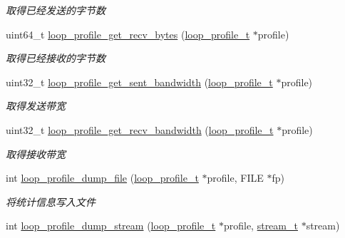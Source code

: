 \begin{DoxyCompactItemize}
\begin{DoxyCompactList}\small\item\em 取得已经发送的字节数 \end{DoxyCompactList}\item 
uint64\+\_\+t \hyperlink{a00080_aabcce950d0234d7dab3740e97f914c95_aabcce950d0234d7dab3740e97f914c95}{loop\+\_\+profile\+\_\+get\+\_\+recv\+\_\+bytes} (\hyperlink{a00051_ad060e1396346d2f5db1ec0597376a107_ad060e1396346d2f5db1ec0597376a107}{loop\+\_\+profile\+\_\+t} $\ast$profile)
\begin{DoxyCompactList}\small\item\em 取得已经接收的字节数 \end{DoxyCompactList}\item 
uint32\+\_\+t \hyperlink{a00080_a05b508d71cdd8841e352657afa86b919_a05b508d71cdd8841e352657afa86b919}{loop\+\_\+profile\+\_\+get\+\_\+sent\+\_\+bandwidth} (\hyperlink{a00051_ad060e1396346d2f5db1ec0597376a107_ad060e1396346d2f5db1ec0597376a107}{loop\+\_\+profile\+\_\+t} $\ast$profile)
\begin{DoxyCompactList}\small\item\em 取得发送带宽 \end{DoxyCompactList}\item 
uint32\+\_\+t \hyperlink{a00080_aa14aa9382129b3c7facf5160ab7b1f7c_aa14aa9382129b3c7facf5160ab7b1f7c}{loop\+\_\+profile\+\_\+get\+\_\+recv\+\_\+bandwidth} (\hyperlink{a00051_ad060e1396346d2f5db1ec0597376a107_ad060e1396346d2f5db1ec0597376a107}{loop\+\_\+profile\+\_\+t} $\ast$profile)
\begin{DoxyCompactList}\small\item\em 取得接收带宽 \end{DoxyCompactList}\item 
int \hyperlink{a00080_ab1f417c556537e763c3b06e9129740a6_ab1f417c556537e763c3b06e9129740a6}{loop\+\_\+profile\+\_\+dump\+\_\+file} (\hyperlink{a00051_ad060e1396346d2f5db1ec0597376a107_ad060e1396346d2f5db1ec0597376a107}{loop\+\_\+profile\+\_\+t} $\ast$profile, F\+I\+L\+E $\ast$fp)
\begin{DoxyCompactList}\small\item\em 将统计信息写入文件 \end{DoxyCompactList}\item 
int \hyperlink{a00080_a8fdc6b3f9949a392d5158ca4b6120bc1_a8fdc6b3f9949a392d5158ca4b6120bc1}{loop\+\_\+profile\+\_\+dump\+\_\+stream} (\hyperlink{a00051_ad060e1396346d2f5db1ec0597376a107_ad060e1396346d2f5db1ec0597376a107}{loop\+\_\+profile\+\_\+t} $\ast$profile, \hyperlink{a00051_a261dba04f46f5c59a68a05f69f5a65a8_a261dba04f46f5c59a68a05f69f5a65a8}{stream\+\_\+t} $\ast$stream)

\end{DoxyCompactItemize}
